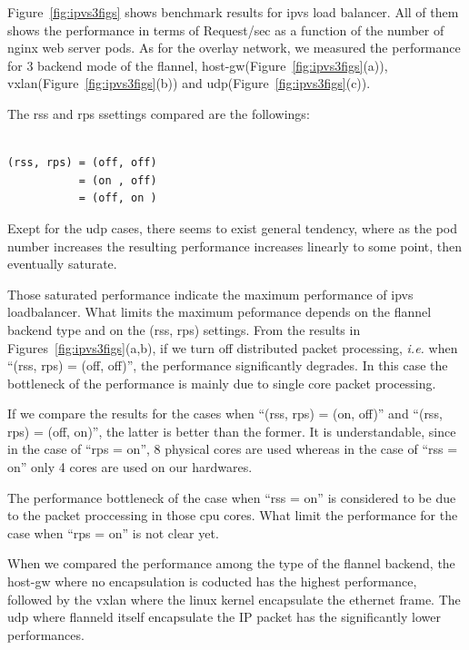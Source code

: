 Figure~\ref{fig:ipvs3figs} shows benchmark results for ipvs load balancer. 
All of them shows the performance in terms of Request/sec as a function of the number of nginx web server pods.
As for the overlay network, we measured the performance for 3 backend mode of the flannel, 
host-gw(Figure~\ref{fig:ipvs3figs}(a)), vxlan(Figure~\ref{fig:ipvs3figs}(b)) and udp(Figure~\ref{fig:ipvs3figs}(c)).

The rss and rps ssettings compared are the followings: 

\begin{center}
\begin{minipage}{0.8\columnwidth}
\begin{verbatim}

(rss, rps) = (off, off)
           = (on , off)
           = (off, on )

\end{verbatim}
\end{minipage}
\end{center}

Exept for the udp cases, there seems to exist general tendency, 
where as the pod number increases the resulting performance increases linearly to some point, 
then eventually saturate.

Those saturated performance indicate the maximum performance of ipvs loadbalancer.
What limits the maximum peformance depends on the flannel backend type and on the (rss, rps) settings.
From the results in Figures~\ref{fig:ipvs3figs}(a,b), if we turn off distributed packet processing,
{\it i.e.} when \enquote{(rss, rps) = (off, off)}, the performance significantly degrades. 
In this case the bottleneck of the performance is mainly due to single core packet processing.

If we compare the results for the cases when \enquote{(rss, rps) = (on, off)} and \enquote{(rss, rps) = (off, on)},
the latter is better than the former.
It is understandable, since in the case of \enquote{rps = on}, 8 physical cores are used whereas 
in the case of \enquote{rss = on} only 4 cores are used on our hardwares.

The performance bottleneck of the case when \enquote{rss = on} is considered 
to be due to the packet proccessing in those cpu cores.
What limit the performance for the case when \enquote{rps = on} is not clear yet.

When we compared the performance among the type of the flannel backend, 
the host-gw where no encapsulation is coducted has the highest performance,
followed by the vxlan where the linux kernel encapsulate the ethernet frame.
The udp where flanneld itself encapsulate the IP packet has the significantly lower performances.

